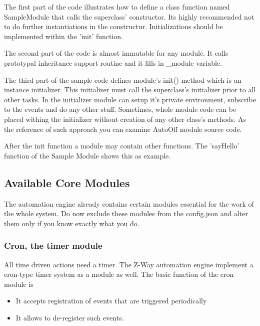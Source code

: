 The first part of the code illustrates how to define a class function named SampleModule that calls the superclass' constructor. Its highly recommended not to do further instantiations in the constructur. Initializations should be implemented within the 'init' function.
 
The second part of the code is almost immutable for any module. It calls prototypal inheritance support routine and it fills in \_module variable.

The third part of the sample code defines module's init() method which is an 
instance initializer. This initializer must call the superclass's initializer prior to all other tasks. In the initializer module can setup it's private environment, subscribe to the events and do any other stuff.
Sometimes, whole module code can be placed withing the initializer without creation of any other class's methods. As the reference of such approach you can examine AutoOff module source code.

After the init function a module may contain other functions. The 'sayHello' function of the Sample Module shows this as example.

\subsection{Available Core Modules}


The automation engine already contains certain modules essential for the work of the whole system. Do now exclude these modules from the config.json and alter them only if you know exactly what you do.


\subsubsection{Cron, the timer module}

All time driven actions need a timer. The Z-Way automation engine implement a cron-type timer 
system as a module as well. The basic function of the cron module is

\begin{itemize}
\item It accepts registration of events that are triggered periodically
\item It allows to de-register such events. 
\end{itemize}


